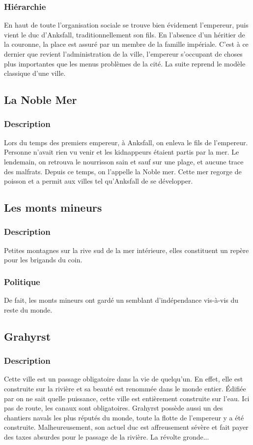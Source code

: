 \subsubsection{Hiérarchie}
En haut de toute l'organisation sociale se trouve bien évidement l’empereur, puis vient le duc d’Anksfall, traditionnellement son fils. En l’absence d’un héritier de la couronne, la place est assuré par un membre de la famille impériale. C’est à ce dernier que revient l’administration de la ville, l’empereur s’occupant de choses plus importantes que les menus problèmes de la cité. La suite reprend le modèle classique d’une ville. 
\subsection{La Noble Mer}
\subsubsection{Description}
\hypertarget{lanoblemer}{}Lors du temps des premiers empereur, à Anksfall, on enleva le fils de l'empereur.
Personne n'avait rien vu venir et les kidnappeurs étaient partis par la mer. 
Le lendemain, on retrouva le nourrisson sain  et sauf sur une plage, et aucune trace des malfrats.
Depuis ce temps, on l'appelle la Noble mer.
Cette mer regorge de poisson et a permit aux villes tel qu'Anksfall de se développer.
\subsection{Les monts mineurs}
\subsubsection{Description}
Petites montagnes sur la rive sud de la mer intérieure, elles constituent un repère pour les brigands du coin.
\subsubsection{Politique}
De fait, les monts mineurs ont gardé un semblant d'indépendance vis-à-vis du reste du monde.
\subsection{Grahyrst}
\subsubsection{Description}
\hypertarget {grahyrst}{}Cette ville est un passage obligatoire dans la vie de quelqu’un. En effet, elle est construite sur la rivière et sa beauté est renommée dans le monde entier. Édifiée par on ne sait quelle puissance, cette ville est entièrement construite sur l’eau. Ici pas de route, les canaux sont obligatoires. Grahyrst possède aussi un des chantiers navals les plus réputés du monde, toute la flotte de l’empereur y a été construite. Malheureusement, son actuel duc est affreusement sévère et fait payer des taxes absurdes pour le passage de la rivière. La révolte gronde...
